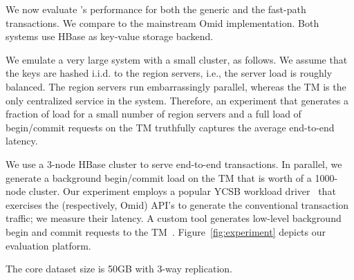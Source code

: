We now evaluate {\sys}'s performance for both the generic and the fast-path transactions. 
We compare {\sys\/} to the mainstream Omid implementation. Both systems use HBase 
as key-value storage backend. 

We emulate a very large system with a small cluster, as follows. We assume that the keys 
are hashed i.i.d. to the region servers, i.e., the server load is roughly balanced. The region
servers run embarrassingly parallel, whereas the TM  is the only centralized service in the 
system. Therefore, an experiment that generates a fraction of load for a small number of 
region servers and a full load of begin/commit requests on the TM truthfully captures 
the average end-to-end latency. 

We use a 3-node HBase cluster to serve end-to-end transactions. In parallel, we generate a background 
begin/commit load on the TM that is worth of a 1000-node cluster. Our experiment employs a popular
YCSB workload driver~\cite{Cooper:2010:BCS:1807128.1807152} that exercises the {\sys} (respectively, 
Omid) API's to generate the conventional transaction traffic; we measure their latency. 
A custom tool generates low-level background begin and commit requests to the TM~\cite{Omid2017}.
Figure~\ref{fig:experiment} depicts our evaluation platform. 

The core dataset size is 50GB with 3-way replication. 


